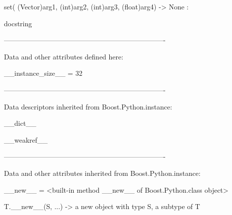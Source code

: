 \documentclass[letterpaper,10pt,english]{sphinxmanual}
\begin{document}
\begin{description}
\begin{description}
\begin{DUlineblock}{0em}
\begin{DUlineblock}{\DUlineblockindent}
\begin{DUlineblock}{\DUlineblockindent}
\item[] 
\end{DUlineblock}
\item[] set( (Vector)arg1, (int)arg2, (int)arg3, (float)arg4) -\textgreater{} None :
\item[]
\begin{DUlineblock}{\DUlineblockindent}
\item[] docstring
\item[] 
\end{DUlineblock}
\end{DUlineblock}
\item[] ----------------------------------------------------------------------
\item[] Data and other attributes defined here:
\item[] 
\item[] \_\_instance\_size\_\_ = 32
\item[] 
\item[] ----------------------------------------------------------------------
\item[] Data descriptors inherited from Boost.Python.instance:
\item[] 
\item[] \_\_dict\_\_
\item[] 
\item[] \_\_weakref\_\_
\item[] 
\item[] ----------------------------------------------------------------------
\item[] Data and other attributes inherited from Boost.Python.instance:
\item[] 
\item[] \_\_new\_\_ = \textless{}built-in method \_\_new\_\_ of Boost.Python.class object\textgreater{}
\item[]
\begin{DUlineblock}{\DUlineblockindent}
\item[] T.\_\_new\_\_(S, ...) -\textgreater{} a new object with type S, a subtype of T
\end{DUlineblock}
\end{DUlineblock}


\end{description}
\end{description}
\end{document}
